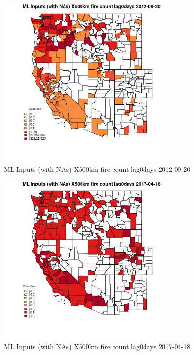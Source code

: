 \begin{figure} 
\centering  
\includegraphics[width=0.77\textwidth]{Code_Outputs/Report_ML_input_PM25_Step4_part_e_de_duplicated_aves_compiled_2019-05-14wNAs_CountyX500km_fire_count_lag0daysMean2012-09-20_2012-09-20.jpg} 
\caption{\label{fig:Report_ML_input_PM25_Step4_part_e_de_duplicated_aves_compiled_2019-05-14wNAsCountyX500km_fire_count_lag0daysMean2012-09-20_2012-09-20}ML Inputs (with NAs) X500km fire count lag0days 2012-09-20} 
\end{figure} 
 

\begin{figure} 
\centering  
\includegraphics[width=0.77\textwidth]{Code_Outputs/Report_ML_input_PM25_Step4_part_e_de_duplicated_aves_compiled_2019-05-14wNAs_CountyX500km_fire_count_lag0daysMean2017-04-18_2017-04-18.jpg} 
\caption{\label{fig:Report_ML_input_PM25_Step4_part_e_de_duplicated_aves_compiled_2019-05-14wNAsCountyX500km_fire_count_lag0daysMean2017-04-18_2017-04-18}ML Inputs (with NAs) X500km fire count lag0days 2017-04-18} 
\end{figure} 
 

